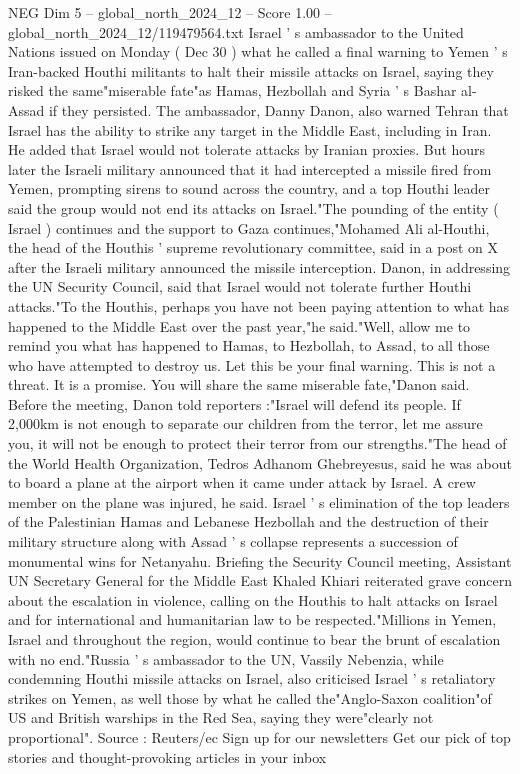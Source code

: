 \begin{textsample}{NEG Dim 5 – global\_north\_2024\_12 – Score 1.00 – global\_north\_2024\_12/119479564.txt}  \label{ex:f5_neg_353}
Israel ' s ambassador to the United Nations issued on Monday ( Dec 30 ) what he called a final warning to Yemen ' s Iran-backed Houthi militants to halt their missile attacks on Israel, saying they risked the same"miserable fate"as Hamas, Hezbollah and Syria ' s Bashar al-Assad if they persisted.
The ambassador, Danny Danon, also warned Tehran that Israel has the ability to strike any target in the Middle East, including in Iran.
He added that Israel would not tolerate attacks by Iranian proxies.
But hours later the Israeli military announced that it had intercepted a missile fired from Yemen, prompting sirens to sound across the country, and a top Houthi leader said the group would not end its attacks on Israel."The pounding of the entity ( Israel ) continues and the support to Gaza continues,"Mohamed Ali al-Houthi, the head of the Houthis ' supreme revolutionary committee, said in a post on X after the Israeli military announced the missile interception.
Danon, in addressing the UN Security Council, said that Israel would not tolerate further Houthi attacks."To the Houthis, perhaps you have not been paying attention to what has happened to the Middle East over the past year,"he said."Well, allow me to remind you what has happened to Hamas, to Hezbollah, to Assad, to all those who have attempted to destroy us.
Let this be your final warning.
This is not a threat.
It is a promise.
You will share the same miserable fate,"Danon said.
Before the meeting, Danon told reporters :"Israel will defend its people.
If 2,000km is not enough to separate our children from the terror, let me assure you, it will not be enough to protect their terror from our strengths."The head of the World Health Organization, Tedros Adhanom Ghebreyesus, said he was about to board a plane at the airport when it came under attack by Israel.
A crew member on the plane was injured, he said.
Israel ' s elimination of the top leaders of the Palestinian Hamas and Lebanese Hezbollah and the destruction of their military structure along with Assad ' s collapse represents a succession of monumental wins for Netanyahu.
Briefing the Security Council meeting, Assistant UN Secretary General for the Middle East Khaled Khiari reiterated grave concern about the escalation in violence, calling on the Houthis to halt attacks on Israel and for international and humanitarian law to be respected."Millions in Yemen, Israel and throughout the region, would continue to bear the brunt of escalation with no end."Russia ' s ambassador to the UN, Vassily Nebenzia, while condemning Houthi missile attacks on Israel, also criticised Israel ' s retaliatory strikes on Yemen, as well those by what he called the"Anglo-Saxon coalition"of US and British warships in the Red Sea, saying they were"clearly not proportional".
Source : Reuters/ec Sign up for our newsletters Get our pick of top stories and thought-provoking articles in your inbox

\end{textsample}

